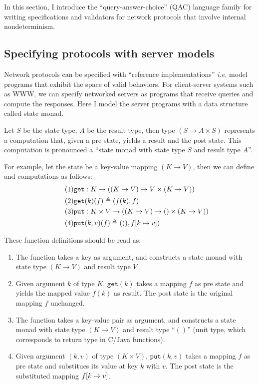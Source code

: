 In this section, I introduce the ``query-answer-choice'' (QAC) language family
for writing specifications and validators for network protocols that involve
internal nondeterminism.

\subsection{Specifying protocols with server models}
Network protocols can be specified with ``reference implementations'' {\it i.e.}
model programs that exhibit the space of valid behaviors.  For client-server
systems such as WWW, we can specify networked servers as programs that receive
queries and compute the responses.  Here I model the server programs with a data
structure called state monad.

\begin{definition}
  Let $S$ be the state type, $A$ be the result type, then type $(S\to A\times
  S)$ represents a computation that, given a pre state, yields a result and the
  post state.  This computation is pronounced a ``state monad with state type
  $S$ and result type $A$''.

  For example, let the state be a key-value mapping $(K\to V)$, then we can
  define  and  computations as follows:
  \begin{align}
    \tag{1}&\mathtt{get}:K\to((K\to V)\to V\times(K\to V))\\
    \tag{2}&\mathtt{get}(k)(f)\triangleq (f(k), f)\\
    \tag{3}&\mathtt{put}:K\times V\to((K\to V)\to ()\times(K\to V))\\
    \tag{4}&\mathtt{put}(k,v)(f)\triangleq((),f[k\mapsto v])
  \end{align}

  These function definitions should be read as:
  \begin{enumerate}
    \item The  function takes a key as argument, and constructs a
      state monad with state type $(K\to V)$ and result type $V$.
    \item Given argument $k$ of type $K$, $\mathtt{get}(k)$ takes a mapping $f$
      as pre state and yields the mapped value $f(k)$ as result.  The post state
      is the original mapping $f$ unchanged.
    \item The  function takes a key-value pair as argument, and
      constructs a state monad with state type $(K\to V)$ and result type
      ``$()$'' (unit type, which corresponds to  return type in
      C/Java functions).
    \item Given argument $(k,v)$ of type $(K\times V)$, $\mathtt{put}(k,v)$
      takes a mapping $f$ as pre state and substitues its value at key $k$ with
      $v$.  The post state is the substituted mapping $f[k\mapsto v]$.
  \end{enumerate}
\end{definition}

